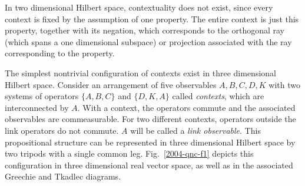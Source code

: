 \documentclass{aipproc}
\begin{document}
In two dimensional Hilbert space, contextuality does not exist,
since every context is fixed by the assumption of one property.
The entire context is just this property, together with its negation,
which corresponds to the orthogonal ray (which spans a one dimensional subspace)
or projection associated with the ray corresponding to the property.

The simplest nontrivial configuration of contexts exist in three dimensional Hilbert space.
Consider an arrangement
of five observables $A,B,C,D,K$ with two systems
of operators
$\{A,B,C\}$
and
$\{D,K,A\}$
called {\em contexts},
which are interconnected by $A$.
With a context, the operators commute and the associated observables are commeasurable.
For two different contexts, operators outside the link operators do not commute.
$A$ will be called a {\em link observable}.
This propositional structure can be represented in three dimensional Hilbert space
by two tripods with a single common leg.
Fig.~\ref{2004-qnc-f1} depicts this configuration in three dimensional real vector space,
as well as in the associated Greechie and Tkadlec diagrams.
\end{document}
